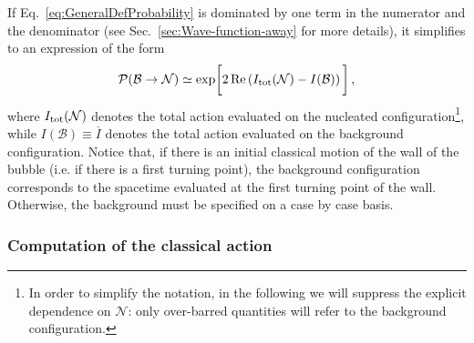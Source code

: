 \documentclass[11pt,a4paper]{article}
\begin{document}
If Eq.~\eqref{eq:GeneralDefProbability} is dominated by one term in the numerator and the denominator (see Sec.~\ref{sec:Wave-function-away} for more details), it simplifies to an expression of the form
\begin{equation}
\label{eq:ApproxProbability}
\mathcal{P}(\mathcal{B} \rightarrow \mathcal{N}) \simeq \text{exp} \bigg[2 \, \text{Re}\left(I_{\rm tot}(\mathcal{N}) - I(\mathcal{B})\right)\bigg] \,,
\end{equation}
where $I_{\rm tot}(\mathcal{N})$ denotes the total action evaluated on the nucleated configuration\footnote{In order to simplify the notation, in the following we will suppress the explicit dependence on $\mathcal{N}$: only over-barred quantities will refer to the background configuration.}, while $I(\mathcal{B}) \equiv \overline{I}$ denotes the total action evaluated on the background configuration. Notice that, if there is an initial classical motion of the wall of the bubble (i.e. if there is a first turning point), the background configuration corresponds to the spacetime evaluated at the first turning point of the wall. Otherwise, the background must be specified on a case by case basis.

\subsubsection*{Computation of the classical action}
\end{document}
